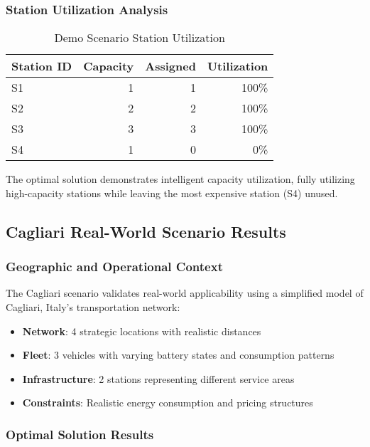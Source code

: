 \documentclass[12pt,a4paper]{article}
\begin{document}
\subsubsection{Station Utilization Analysis}

\begin{table}[H]
\centering
\caption{Demo Scenario Station Utilization}
\label{tab:demo_utilization}
\begin{tabular}{@{}lrrr@{}}
\toprule
\textbf{Station ID} & \textbf{Capacity} & \textbf{Assigned} & \textbf{Utilization} \\
\midrule
S1 & 1 & 1 & 100\% \\
S2 & 2 & 2 & 100\% \\
S3 & 3 & 3 & 100\% \\
S4 & 1 & 0 & 0\% \\
\bottomrule
\end{tabular}
\end{table}

The optimal solution demonstrates intelligent capacity utilization, fully utilizing high-capacity stations while leaving the most expensive station (S4) unused.

\subsection{Cagliari Real-World Scenario Results}

\subsubsection{Geographic and Operational Context}

The Cagliari scenario validates real-world applicability using a simplified model of Cagliari, Italy's transportation network:

\begin{itemize}
\item \textbf{Network}: 4 strategic locations with realistic distances
\item \textbf{Fleet}: 3 vehicles with varying battery states and consumption patterns  
\item \textbf{Infrastructure}: 2 stations representing different service areas
\item \textbf{Constraints}: Realistic energy consumption and pricing structures
\end{itemize}

\subsubsection{Optimal Solution Results}
\end{document}
